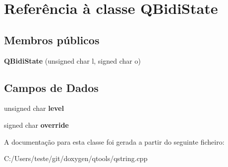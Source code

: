 \hypertarget{class_q_bidi_state}{\section{Referência à classe Q\-Bidi\-State}
\label{class_q_bidi_state}
}
\subsection*{Membros públicos}
\begin{DoxyCompactItemize}
\item 
\hypertarget{class_q_bidi_state_aa567a00ccd2f912f9b91ecdaf82b42af}{{\bfseries Q\-Bidi\-State} (unsigned char l, signed char o)}\label{class_q_bidi_state_aa567a00ccd2f912f9b91ecdaf82b42af}

\end{DoxyCompactItemize}
\subsection*{Campos de Dados}
\begin{DoxyCompactItemize}
\item 
\hypertarget{class_q_bidi_state_a0d957bf1afecc6bd1ebcb451c7abe11d}{unsigned char {\bfseries level}}\label{class_q_bidi_state_a0d957bf1afecc6bd1ebcb451c7abe11d}

\item 
\hypertarget{class_q_bidi_state_a3f4dc26b5abf9b3ab8f4dd50f44e9bea}{signed char {\bfseries override}}\label{class_q_bidi_state_a3f4dc26b5abf9b3ab8f4dd50f44e9bea}

\end{DoxyCompactItemize}


A documentação para esta classe foi gerada a partir do seguinte ficheiro\-:\begin{DoxyCompactItemize}
\item 
C\-:/\-Users/teste/git/doxygen/qtools/qstring.\-cpp\end{DoxyCompactItemize}
